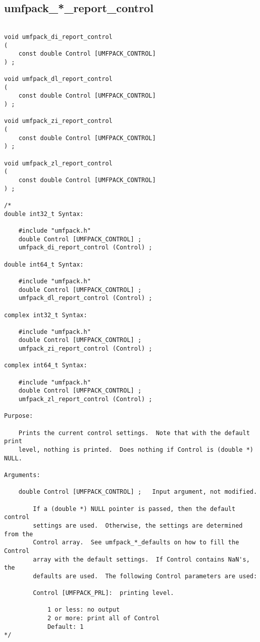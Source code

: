 \documentclass[11pt]{article}
\begin{document}
\newpage
\subsection{umfpack\_*\_report\_control}

{\footnotesize
\begin{verbatim}

void umfpack_di_report_control
(
    const double Control [UMFPACK_CONTROL]
) ;

void umfpack_dl_report_control
(
    const double Control [UMFPACK_CONTROL]
) ;

void umfpack_zi_report_control
(
    const double Control [UMFPACK_CONTROL]
) ;

void umfpack_zl_report_control
(
    const double Control [UMFPACK_CONTROL]
) ;

/*
double int32_t Syntax:

    #include "umfpack.h"
    double Control [UMFPACK_CONTROL] ;
    umfpack_di_report_control (Control) ;

double int64_t Syntax:

    #include "umfpack.h"
    double Control [UMFPACK_CONTROL] ;
    umfpack_dl_report_control (Control) ;

complex int32_t Syntax:

    #include "umfpack.h"
    double Control [UMFPACK_CONTROL] ;
    umfpack_zi_report_control (Control) ;

complex int64_t Syntax:

    #include "umfpack.h"
    double Control [UMFPACK_CONTROL] ;
    umfpack_zl_report_control (Control) ;

Purpose:

    Prints the current control settings.  Note that with the default print
    level, nothing is printed.  Does nothing if Control is (double *) NULL.

Arguments:

    double Control [UMFPACK_CONTROL] ;   Input argument, not modified.

        If a (double *) NULL pointer is passed, then the default control
        settings are used.  Otherwise, the settings are determined from the
        Control array.  See umfpack_*_defaults on how to fill the Control
        array with the default settings.  If Control contains NaN's, the
        defaults are used.  The following Control parameters are used:

        Control [UMFPACK_PRL]:  printing level.

            1 or less: no output
            2 or more: print all of Control
            Default: 1
*/
\end{verbatim}
}
\end{document}
